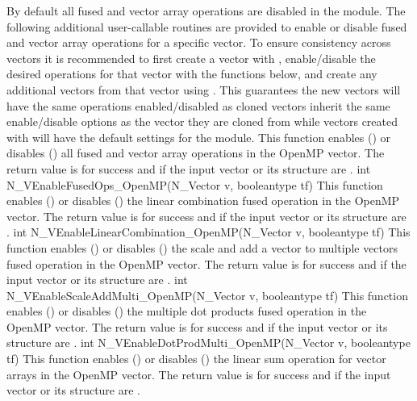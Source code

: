 By default all fused and vector array operations are disabled in the {\nvecopenmp}
module. The following additional user-callable routines are provided to
enable or disable fused and vector array operations for a specific vector. To
ensure consistency across vectors it is recommended to first create a vector
with , enable/disable the desired operations for that vector
with the functions below, and create any additional vectors from that vector
using . This guarantees the new vectors will have the same
operations enabled/disabled as cloned vectors inherit the same enable/disable
options as the vector they are cloned from while vectors created with
 will have the default settings for the {\nvecopenmp} module.
{
  This function enables () or disables () all fused and
  vector array operations in the OpenMP vector. The return value is  for
  success and  if the input vector or its  structure are .
}
{
  int N\_VEnableFusedOps\_OpenMP(N\_Vector v, booleantype tf)
}
{
  This function enables () or disables () the linear
  combination fused operation in the OpenMP vector. The return value is  for
  success and  if the input vector or its  structure are .
}
{
  int N\_VEnableLinearCombination\_OpenMP(N\_Vector v, booleantype tf)
}
{
  This function enables () or disables () the scale and
  add a vector to multiple vectors fused operation in the OpenMP vector. The
  return value is  for success and  if the input vector or its
   structure are .
}
{
  int N\_VEnableScaleAddMulti\_OpenMP(N\_Vector v, booleantype tf)
}
{
  This function enables () or disables () the multiple
  dot products fused operation in the OpenMP vector. The return value is 
  for success and  if the input vector or its  structure are
  .
}
{
  int N\_VEnableDotProdMulti\_OpenMP(N\_Vector v, booleantype tf)
}
{
  This function enables () or disables () the linear sum
  operation for vector arrays in the OpenMP vector. The return value is  for
  success and  if the input vector or its  structure are .
}
